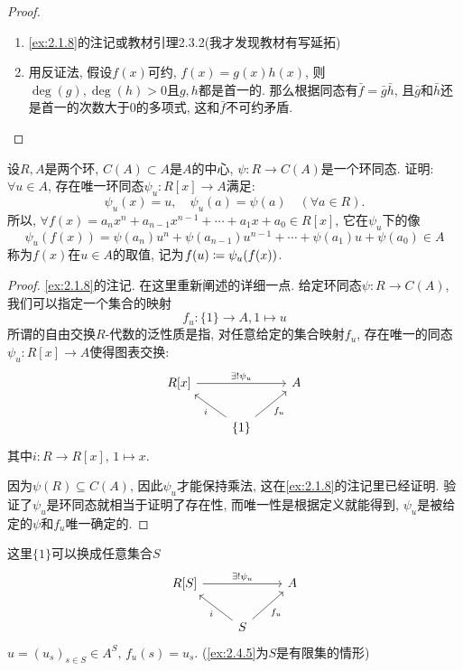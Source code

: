 \begin{proof}
    \begin{enumerate}[(1)]
        \item \ref{ex:2.1.8}的注记或教材引理2.3.2(我才发现教材有写延拓)
        \item 用反证法, 假设$f(x)$可约, $f(x) = g(x)h(x)$, 则$\deg(g), \deg(h) > 0$且$g, h$都是首一的. 那么根据同态有$\bar{f} = \bar{g}\bar{h}$, 且$\bar{g}$和$\bar{h}$还是首一的次数大于$0$的多项式, 这和$\bar{f}$不可约矛盾.
    \end{enumerate}
\end{proof}

\begin{problem}\label{ex:2.3.7}
    设$R, A$是两个环, $C(A) \subset A$是$A$的中心, $\psi:R \to C(A)$是一个环同态. 证明: $\forall u \in A$, 存在唯一环同态$\psi_u:R[x] \to A$满足:
    \[
        \psi_u(x) = u,\quad \psi_u(a) = \psi(a) \quad (\forall a \in R).
    \]
    所以, $\forall f(x) = a_nx^n + a_{n - 1}x^{n - 1} + \cdots + a_1x + a_0 \in R[x]$, 它在$\psi_u$下的像
    \[
        \psi_u(f(x)) = \psi(a_n)u^n + \psi(a_{n - 1})u^{n - 1} + \cdots + \psi(a_1)u + \psi(a_0) \in A
    \]
    称为$f(x)$在$u \in A$的取值, 记为$f(u) \mathrel{\coloneqq} \psi_u(f(x))$.
\end{problem}

\begin{proof}
    \ref{ex:2.1.8}的注记. 在这里重新阐述的详细一点. 给定环同态$\psi:R \to C(A)$, 我们可以指定一个集合的映射
    \[
        f_u:\{1\} \to A, 1 \mapsto u
    \]
    所谓的自由交换$R$-代数的泛性质是指, 对任意给定的集合映射$f_u$, 存在唯一的同态$\psi_u:R[x] \to A$使得图表交换:
    \[
        \begin{tikzcd}
            {R[x]} \arrow[rr, "\exists!\psi_u"] &                                          & A \\
                                                & \{1\} \arrow[lu, "i"] \arrow[ru, "f_u"'] &  
        \end{tikzcd}
    \]
    其中$i:R \to R[x],\, 1 \mapsto x$.

    因为$\psi(R) \subseteq C(A)$, 因此$\psi_u$才能保持乘法, 这在\ref{ex:2.1.8}的注记里已经证明. 验证了$\psi_u$是环同态就相当于证明了存在性, 而唯一性是根据定义就能得到, $\psi_u$是被给定的$\psi$和$f_u$唯一确定的.
\end{proof}

\begin{remark}
    这里$\{1\}$可以换成任意集合$S$
    \[
        \begin{tikzcd}
        {R[S]} \arrow[rr, "\exists!\psi_u"] &                                      & A \\
                                            & S \arrow[lu, "i"] \arrow[ru, "f_u"'] &  
        \end{tikzcd}
    \]
    $u = (u_s)_{s \in S} \in A^S,\, f_u(s) = u_s$. (\ref{ex:2.4.5}为$S$是有限集的情形)
\end{remark}

